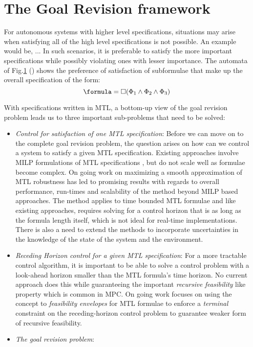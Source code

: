 \section{The Goal Revision framework}

For autonomous systems with higher level specifications, situations may arise when satisfying all of the high level specifications is not possible. An example would be,
...
In such scenarios, it is preferable to satisfy the more important specifications while possibly violating ones with lesser importance. The automata of Fig.\ref{} ()  shows the preference of satisfaction of subformulae that make up the overall specification of the form:
\begin{equation}
\formula = \always (\Phi_1 \land \Phi_2 \land \Phi_3)
\end{equation}







With specifications written in MTL, a bottom-up view of the goal revision problem leads us to three important sub-problems that need to be solved:

\begin{itemize}
\item \textit{Control for satisfaction of one MTL specification}: Before we can move on to the complete goal revision problem, the question arises on how can we control a system to satisfy a given MTL specification. Existing approaches involve MILP formulations of MTL specifications \cite{Raman14_MPCSTL}, but do not scale well as formulae become complex. On going work on maximizing a smooth approximation of MTL robustness \cite{PantAM17_SmoothOpTechRpt} has led to promising results with regards to overall performance, run-times and scalability of the method beyond MILP based approaches. The method applies to time bounded MTL formulae and like existing approaches, requires solving for a control horizon that is as long as the formula length itself, which is not ideal for real-time implementations. There is also a need to extend the methods to incorporate uncertainties in the knowledge of the state of the system and the environment.

\item \textit{Receding Horizon control for a given MTL specification}: For a more tractable control algorithm, it is important to be able to solve a control problem with a look-ahead horizon smaller than the MTL formula's time horizon. No current approach does this while guaranteeing the important \textit{recursive feasibility} like property which is common in MPC. On going work focuses on using the concept to \textit{feasibility envelopes}\cite{Belta_FE_CDC16} for MTL formulae to enforce a \textit{terminal} constraint on the receding-horizon control problem to guarantee weaker form of recursive feasibility. 

\item \textit{The goal revision problem}: 

\end{itemize}

